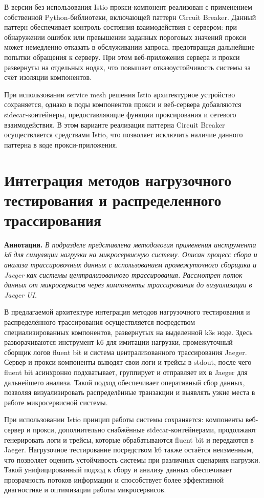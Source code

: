 В версии без использования Istio прокси-компонент реализован с применением собственной Python-библиотеки, включающей паттерн Circuit Breaker. Данный паттерн обеспечивает контроль состояния взаимодействия с сервером: при обнаружении ошибок или превышении заданных пороговых значений прокси может немедленно отказать в обслуживании запроса, предотвращая дальнейшие попытки обращения к серверу. При этом веб-приложения сервера и прокси развернуты на отдельных нодах, что повышает отказоустойчивость системы за счёт изоляции компонентов.

При использовании service mesh решения Istio архитектурное устройство сохраняется, однако в поды компонентов прокси и веб-сервера добавляются sidecar-контейнеры, предоставляющие функции проксирования и сетевого взаимодействия. В этом варианте реализация паттерна Circuit Breaker осуществляется средствами Istio, что позволяет исключить наличие данного паттерна в коде прокси-приложения. 

  
\section{Интеграция методов нагрузочного тестирования и распределенного трассирования}
  
\textbf{Аннотация.} \textit{В подразделе представлена методология применения инструмента k6 для симуляции нагрузки на микросервисную систему. Описан процесс сбора и анализа трассировочных данных с использованием промежуточного сборщика и Jaeger как системы централизованного трассирования. Рассмотрен поток данных от микросервисов через компоненты трассирования до визуализации в Jaeger UI.}

В предлагаемой архитектуре интеграция методов нагрузочного тестирования и распределённого трассирования осуществляется посредством специализированных компонентов, развернутых на выделенной k3s ноде. Здесь разворачиваются инструмент k6 для имитации нагрузки, промежуточный сборщик логов fluent bit и система централизованного трассирования Jaeger. Сервер и прокси-компоненты выводят свои логи и трейсы в stdout, после чего fluent bit асинхронно подхватывает, группирует и отправляет их в Jaeger для дальнейшего анализа. Такой подход обеспечивает оперативный сбор данных, позволяя визуализировать распределённые транзакции и выявлять узкие места в работе микросервисной системы.

При использовании Istio принцип работы системы сохраняется: компоненты веб-сервер и прокси, дополнительно снабжённые sidecar-контейнерами, продолжают генерировать логи и трейсы, которые обрабатываются fluent bit и передаются в Jaeger. Нагрузочное тестирование посредством k6 также остаётся неизменным, что позволяет оценить устойчивость системы при различных сценариях нагрузки. Такой унифицированный подход к сбору и анализу данных обеспечивает прозрачность потоков информации и способствует более эффективной диагностике и оптимизации работы микросервисов.
  
